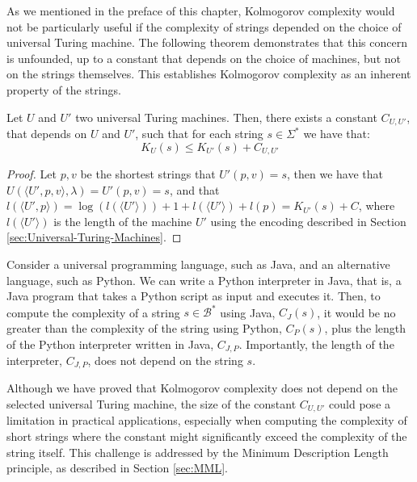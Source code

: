 As we mentioned in the preface of this chapter, Kolmogorov complexity would not be particularly useful if the complexity of strings depended on the choice of universal Turing machine. The following theorem demonstrates that this concern is unfounded, up to a constant that depends on the choice of machines, but not on the strings themselves. This establishes Kolmogorov complexity as an inherent property of the strings.

\begin{theorem}
\label{def:Invariance-theorem}
Let $U$ and $U'$ two universal Turing machines. Then, there exists a constant $C_{U, U'}$, that depends on $U$ and $U'$, such that for each string $s \in \Sigma^{\ast}$ we have that:
\[
K_{U}(s) \leq K_{U'}(s) + C_{U, U'}
\]
\end{theorem}
\begin{proof}
Let $p, v$ be the shortest strings that $U'(p,v)=s$, then we have that $U(\langle U',p, v \rangle, \lambda) = U'(p, v) = s$, and that $l(\langle U',p \rangle) = \log(l(\langle U' \rangle)) + 1 + l(\langle U' \rangle) + l(p) = K_{U'}(s) + C$, where $l(\langle U' \rangle)$ is the length of the machine $U'$ using the encoding described in Section \ref{sec:Universal-Turing-Machines}.
\end{proof}

\begin{example}
Consider a universal programming language, such as Java, and an alternative language, such as Python. We can write a Python interpreter in Java, that is, a Java program that takes a Python script as input and executes it. Then, to compute the complexity of a string $s \in \mathcal{B}^\ast$ using Java, $C_J(s)$, it would be no greater than the complexity of the string using Python, $C_P(s)$, plus the length of the Python interpreter written in Java, $C_{J,P}$. Importantly, the length of the interpreter, $C_{J,P}$, does not depend on the string $s$.
\end{example}

Although we have proved that Kolmogorov complexity does not depend on the selected universal Turing machine, the size of the constant \(C_{U, U'}\) could pose a limitation in practical applications, especially when computing the complexity of short strings where the constant might significantly exceed the complexity of the string itself. This challenge is addressed by the Minimum Description Length principle, as described in Section \ref{sec:MML}.

